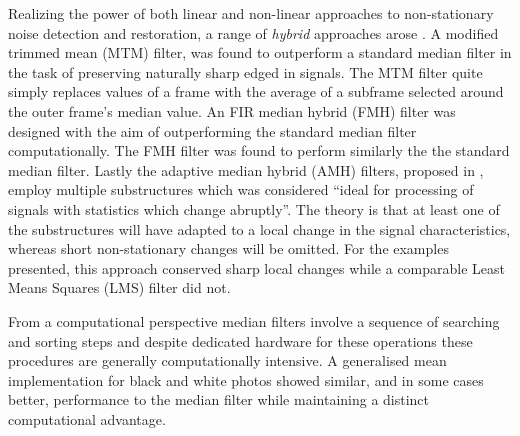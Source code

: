 Realizing the power of both linear and non-linear approaches to non-stationary noise detection and restoration, a range of \emph{hybrid} approaches arose\cite{Nieminen1987a}\cite{Lee1985} \cite{Heinonen1987}. A modified trimmed mean (MTM) filter, was found to outperform a standard median filter in the task of preserving naturally sharp edged in signals\cite{Lee1985}. The MTM filter quite simply replaces values of a frame with the average of a subframe selected around the outer frame's median value\cite{Lee1985}. An FIR median hybrid (FMH) filter was designed with the aim of outperforming the standard median filter computationally. The FMH filter was found to perform similarly the the standard median filter\cite{Heinonen1987}. Lastly the adaptive median hybrid (AMH) filters, proposed in \cite{Nieminen1987a}, employ multiple substructures which was considered ``ideal for processing of signals with statistics which change abruptly''. The theory is that at least one of the substructures will have adapted to a local change in the signal characteristics, whereas short non-stationary changes will be omitted. For the examples presented, this approach conserved sharp local changes while a comparable Least Means Squares (LMS) filter did not\cite{Nieminen1987a}.

From a computational perspective median filters involve a sequence of searching and sorting steps and despite dedicated hardware for these operations these procedures are generally computationally intensive\cite{Kundu1984}. A generalised mean implementation for black and white photos showed similar, and in some cases better, performance to the median filter while maintaining a distinct computational advantage\cite{Kundu1984}.




